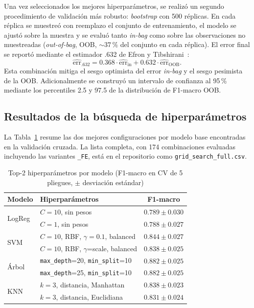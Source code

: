 \documentclass[conference]{IEEEtran}
\begin{document}
Una vez seleccionados los mejores hiperpar\'ametros, se realiz\'o un segundo procedimiento de validaci\'on m\'as robusto: \emph{bootstrap} con 500 r\'eplicas. En cada r\'eplica se muestre\'o con reemplazo el conjunto de entrenamiento, el modelo se ajust\'o sobre la muestra y se evalu\'o tanto \emph{in-bag} como sobre las observaciones no muestreadas (\emph{out-of-bag}, OOB, ${\sim}37\,\%$ del conjunto en cada r\'eplica). El error final se report\'o mediante el estimador .632 de Efron y Tibshirani~\cite{efron1997improvements}:
\begin{equation}
\widehat{\text{err}}_{.632} = 0.368 \cdot \widehat{\text{err}}_{\text{in}} + 0.632 \cdot \widehat{\text{err}}_{\text{OOB}}.
\end{equation}
Esta combinaci\'on mitiga el sesgo optimista del error \emph{in-bag} y el sesgo pesimista de la OOB. Adicionalmente se construy\'o un intervalo de confianza al 95\,\% mediante los percentiles 2.5 y 97.5 de la distribuci\'on de F1-macro OOB.

\subsection{Resultados de la b\'usqueda de hiperpar\'ametros}
La Tabla~\ref{tab:topcv} resume las dos mejores configuraciones por modelo base encontradas en la validaci\'on cruzada. La lista completa, con 174 combinaciones evaluadas incluyendo las variantes \texttt{\_FE}, est\'a en el repositorio como \texttt{grid\_search\_full.csv}.

\begin{table}[!t]
\caption{Top-2 hiperpar\'ametros por modelo (F1-macro en CV de 5 pliegues, $\pm$ desviaci\'on est\'andar)}
\label{tab:topcv}
\centering
\renewcommand{\arraystretch}{1.2}
\footnotesize
\begin{tabular}{lp{4.6cm}c}
\toprule
\textbf{Modelo} & \textbf{Hiperpar\'ametros} & \textbf{F1-macro} \\
\midrule
\multirow{2}{*}{LogReg}
 & $C=10$, sin pesos                          & $\mathbf{0.789 \pm 0.030}$ \\
 & $C=1$, sin pesos                           & $0.788 \pm 0.027$ \\
\midrule
\multirow{2}{*}{SVM}
 & $C=10$, RBF, $\gamma=0.1$, balanced        & $\mathbf{0.844 \pm 0.027}$ \\
 & $C=10$, RBF, $\gamma$=scale, balanced      & $0.838 \pm 0.025$ \\
\midrule
\multirow{2}{*}{\'Arbol}
 & \texttt{max\_depth}=20, \texttt{min\_split}=10       & $\mathbf{0.882 \pm 0.025}$ \\
 & \texttt{max\_depth}=25, \texttt{min\_split}=10       & $0.882 \pm 0.025$ \\
\midrule
\multirow{2}{*}{KNN}
 & $k=3$, distancia, Manhattan                & $\mathbf{0.838 \pm 0.023}$ \\
 & $k=3$, distancia, Euclidiana               & $0.831 \pm 0.024$ \\
\bottomrule
\end{tabular}
\end{table}
\end{document}
